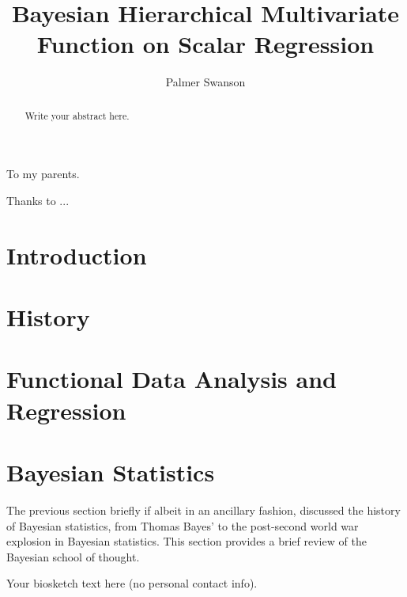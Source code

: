 \documentclass[11pt,expanded,copyright]{template/fsuthesis}
\title{Bayesian Hierarchical Multivariate Function on Scalar Regression}
\author{Palmer Swanson}
\begin{document}
\frontmatter
\maketitle
\makecommitteepage

\begin{dedication}\centering To my parents.\end{dedication}
\begin{acknowledgments}Thanks to ...\end{acknowledgments}

\tableofcontents
\listoftables
\listoffigures

\begin{abstract}
Write your abstract here.
\end{abstract}

\mainmatter

\chapter{Introduction}
  

\chapter{History}
  

\chapter{Functional Data Analysis and Regression}


\chapter{Bayesian Statistics}
The previous section briefly if albeit in an ancillary fashion, discussed the history of Bayesian statistics, from Thomas Bayes' to the post-second world war explosion in Bayesian statistics.  
This section provides a brief review of the Bayesian school of thought.


\renewcommand*{\bibname}{References}
\printbibliography

\begin{biosketch}
Your biosketch text here (no personal contact info).
\end{biosketch}
\end{document}
